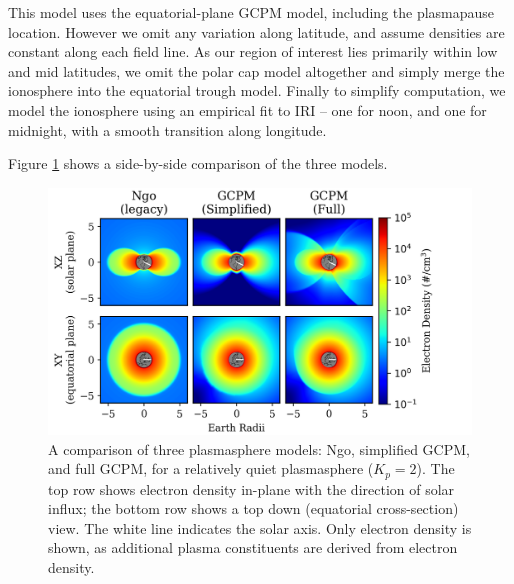 This model uses the equatorial-plane GCPM model, including the plasmapause location. However we omit any variation along latitude, and assume densities are constant along each field line. As our region of interest lies primarily within low and mid latitudes, we omit the polar cap model altogether and simply merge the ionosphere into the equatorial trough model. Finally to simplify computation, we model the ionosphere using an empirical fit to IRI -- one for noon, and one for midnight, with a smooth transition along longitude.

Figure \ref{fig:plasma_model_comparison} shows a side-by-side comparison of the three models.
\begin{figure}[h]
\begin{center}
\includegraphics{figures/plasma_model_comparison_serif.png}
\caption{A comparison of three plasmasphere models: Ngo, simplified GCPM, and full GCPM, for a relatively quiet plasmasphere ($K_p=2$). The top row shows electron density in-plane with the direction of solar influx; the bottom row shows a top down (equatorial cross-section) view. The white line indicates the solar axis. Only electron density is shown, as additional plasma constituents are derived from electron density.}
\label{fig:plasma_model_comparison}
\end{center}
\end{figure}